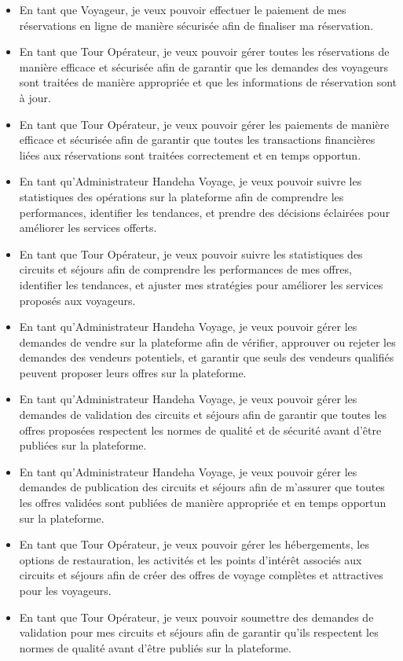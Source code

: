 \documentclass[12pt]{report}
\begin{document}
\begin{itemize}
					\item En tant que Voyageur, je veux pouvoir effectuer le paiement de mes réservations en ligne de manière sécurisée afin de finaliser ma réservation.
					\item En tant que Tour Opérateur, je veux pouvoir gérer toutes les réservations de manière efficace et sécurisée afin de garantir que les demandes des voyageurs sont traitées de manière appropriée et que les informations de réservation sont à jour.
					\item En tant que Tour Opérateur, je veux pouvoir gérer les paiements de manière efficace et sécurisée afin de garantir que toutes les transactions financières liées aux réservations sont traitées correctement et en temps opportun.
					\item En tant qu'Administrateur Handeha Voyage, je veux pouvoir suivre les statistiques des opérations sur la plateforme afin de comprendre les performances, identifier les tendances, et prendre des décisions éclairées pour améliorer les services offerts.
					\item En tant que Tour Opérateur, je veux pouvoir suivre les statistiques des circuits et séjours afin de comprendre les performances de mes offres, identifier les tendances, et ajuster mes stratégies pour améliorer les services proposés aux voyageurs.
					\item En tant qu'Administrateur Handeha Voyage, je veux pouvoir gérer les demandes de vendre sur la plateforme afin de vérifier, approuver ou rejeter les demandes des vendeurs potentiels, et garantir que seuls des vendeurs qualifiés peuvent proposer leurs offres sur la plateforme.	
					\item En tant qu'Administrateur Handeha Voyage, je veux pouvoir gérer les demandes de validation des circuits et séjours afin de garantir que toutes les offres proposées respectent les normes de qualité et de sécurité avant d'être publiées sur la plateforme.
					\item En tant qu'Administrateur Handeha Voyage, je veux pouvoir gérer les demandes de publication des circuits et séjours afin de m'assurer que toutes les offres validées sont publiées de manière appropriée et en temps opportun sur la plateforme.
					\item En tant que Tour Opérateur, je veux pouvoir gérer les hébergements, les options de restauration, les activités et les points d'intérêt associés aux circuits et séjours afin de créer des offres de voyage complètes et attractives pour les voyageurs.
					\item En tant que Tour Opérateur, je veux pouvoir soumettre des demandes de validation pour mes circuits et séjours afin de garantir qu'ils respectent les normes de qualité avant d'être publiés sur la plateforme.

\end{itemize}
\end{document}
